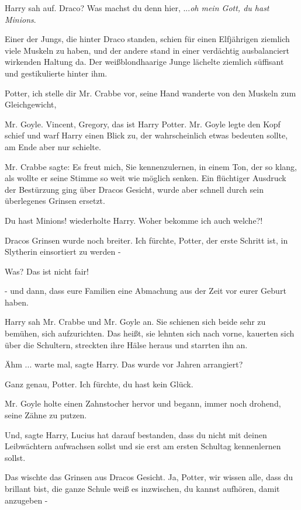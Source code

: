 Harry sah auf. \glqq Draco? Was machst du denn hier, ...\emph{oh mein Gott, du
hast Minions}.\grqq{}

Einer der Jungs, die hinter Draco standen, schien für einen Elfjährigen ziemlich
viele Muskeln zu haben, und der andere stand in einer verdächtig ausbalanciert
wirkenden Haltung da. Der weißblondhaarige Junge lächelte ziemlich süffisant und
gestikulierte hinter ihm.

\glqq Potter, ich stelle dir Mr. Crabbe vor\grqq{}, seine Hand wanderte von den
Muskeln zum Gleichgewicht,

\glqq Mr. Goyle. Vincent, Gregory, das ist Harry Potter.\grqq{} Mr. Goyle legte
den Kopf schief und warf Harry einen Blick zu, der wahrscheinlich etwas bedeuten
sollte, am Ende aber nur schielte.

Mr. Crabbe sagte: \glqq Es freut mich, Sie kennenzulernen\grqq{}, in einem Ton,
der so klang, als wollte er seine Stimme so weit wie möglich senken. Ein
flüchtiger Ausdruck der Bestürzung ging über Dracos Gesicht, wurde aber schnell
durch sein überlegenes Grinsen ersetzt.

\glqq Du hast Minions!\grqq{} wiederholte Harry. \glqq Woher bekomme ich auch
welche?!\grqq{}

Dracos Grinsen wurde noch breiter. \glqq Ich fürchte, Potter, der erste Schritt
ist, in Slytherin einsortiert zu werden -\grqq{}

\glqq Was? Das ist nicht fair!\grqq{}

\glqq - und dann, dass eure Familien eine Abmachung aus der Zeit vor eurer
Geburt haben.\grqq{}

Harry sah Mr. Crabbe und Mr. Goyle an. Sie schienen sich beide sehr zu bemühen,
sich aufzurichten. Das heißt, sie lehnten sich nach vorne, kauerten sich über
die Schultern, streckten ihre Hälse heraus und starrten ihn an.

\glqq Ähm ... warte mal\grqq{}, sagte Harry. \glqq Das wurde vor Jahren
arrangiert?\grqq{}

\glqq Ganz genau, Potter. Ich fürchte, du hast kein Glück.\grqq{}

Mr. Goyle holte einen Zahnstocher hervor und begann, immer noch drohend, seine
Zähne zu putzen.

\glqq Und\grqq{}, sagte Harry, \glqq Lucius hat darauf bestanden, dass du nicht
mit deinen Leibwächtern aufwachsen sollst und sie erst am ersten Schultag
kennenlernen sollst.\grqq{}

Das wischte das Grinsen aus Dracos Gesicht. \glqq Ja, Potter, wir wissen alle,
dass du brillant bist, die ganze Schule weiß es inzwischen, du kannst aufhören,
damit anzugeben -\grqq{}

